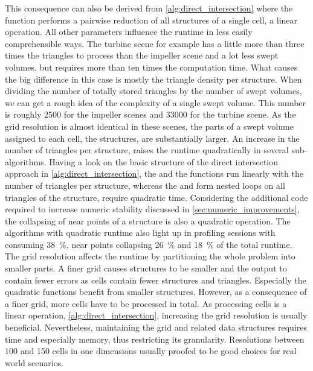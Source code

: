 This consequence can also be derived from \cref{alg:direct_intersection} where the  function performs a pairwise reduction of all structures of a single cell, a linear operation.
All other parameters influence the runtime in less easily comprehensible ways.
The turbine scene for example has a little more than three times the triangles to process than the impeller scene and a lot less swept volumes, but requires more than ten times the computation time.
What causes the big difference in this case is mostly the triangle density per structure.
When dividing the number of totally stored triangles by the number of swept volumes, we can get a rough idea of the complexity of a single swept volume.
This number is roughly 2500 for the impeller scenes and 33000 for the turbine scene.
As the grid resolution is almost identical in these scenes, the parts of a swept volume assigned to each cell, \ie the structures, are substantially larger.
An increase in the number of triangles per structure, raises the runtime quadratically in several sub-algorithms.
Having a look on the basic structure of the direct intersection approach in \cref{alg:direct_intersection}, the  and the  functions run linearly with the number of triangles per structure, whereas the  and  form nested loops on all triangles of the structure, \ie require quadratic time.
Considering the additional code required to increase numeric stability discussed in \cref{sec:numeric_improvements}, the collapsing of near points of a structure is also a quadratic operation.
The algorithms with quadratic runtime also light up in profiling sessions with  consuming \SI{38}{\percent}, near points collapsing \SI{26}{\percent} and  \SI{18}{\percent} of the total runtime.
The grid resolution affects the runtime by partitioning the whole problem into smaller parts.
A finer grid causes structures to be smaller and the output to contain fewer errors as cells contain fewer structures and triangles.
Especially the quadratic functions benefit from smaller structures.
However, as a consequence of a finer grid, more cells have to be processed in total.
As processing cells is a linear operation, \cf \cref{alg:direct_intersection}, increasing the grid resolution is usually beneficial.
Nevertheless, maintaining the grid and related data structures requires time and especially memory, thus restricting its granularity.
Resolutions between 100 and 150 cells in one dimensions usually proofed to be good choices for real world scenarios.


